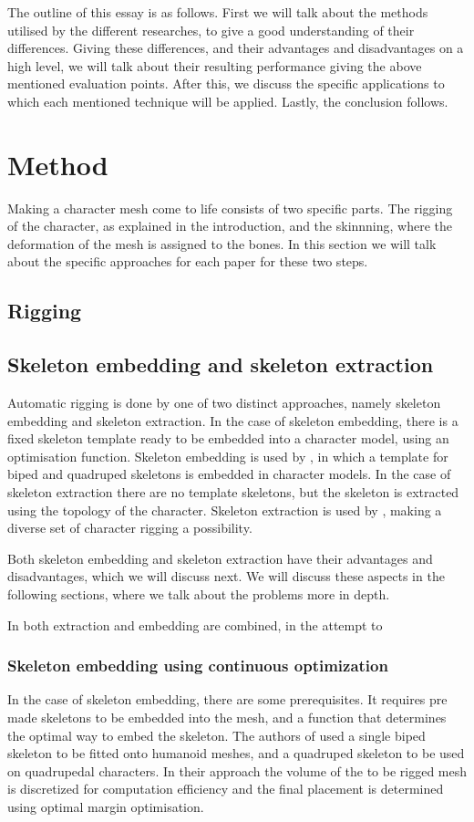 \documentclass{article}
\begin{document}
The outline of this essay is as follows. First we will talk about the methods
utilised by the different researches, to give a good understanding of their
differences. Giving these differences, and their advantages and disadvantages on
a high level, we will talk about their resulting performance giving the above
mentioned evaluation points. After this, we discuss the specific applications to
which each mentioned technique will be applied. Lastly, the conclusion follows.

\section{Method}
Making a character mesh come to life consists of two specific parts. The rigging
of the character, as explained in the introduction, and the skinnning, where the
deformation of the mesh is assigned to the bones. In this section we will talk
about the specific approaches for each paper for these two steps.

\subsection{Rigging}
    \subsection{Skeleton embedding and skeleton extraction}
Automatic rigging is done by one of two distinct approaches, namely skeleton
embedding and skeleton extraction. In the case of skeleton embedding, there
is a fixed skeleton template ready to be embedded into a character model,
using an optimisation function. Skeleton embedding is used by
\citep{paper1}, in which a template for biped and quadruped skeletons is
embedded in character     models. In the case of skeleton extraction there
are no template skeletons, but the skeleton is     extracted using the
topology of the character. Skeleton extraction is used by \citep{paper2},
making a diverse set of character rigging a possibility.

Both skeleton embedding and skeleton extraction have their advantages and
disadvantages, which     we will discuss next. We will discuss these aspects in
the following sections, where we talk     about the problems more in depth. 

In \citep{paper3} both extraction and embedding are combined, in the attempt to    

\subsubsection{Skeleton embedding using continuous optimization}
In the case of skeleton embedding, there are some prerequisites. It requires pre
made skeletons to be embedded into the mesh, and a function that determines the
optimal way to embed the skeleton. 
The authors of \citep{paper1} used a single biped skeleton to be fitted onto
humanoid meshes, and a quadruped skeleton to be used on quadrupedal characters.
In their approach the volume of the to be rigged mesh is discretized for
computation efficiency and the final placement is determined using optimal
margin optimisation.
 
\end{document}
